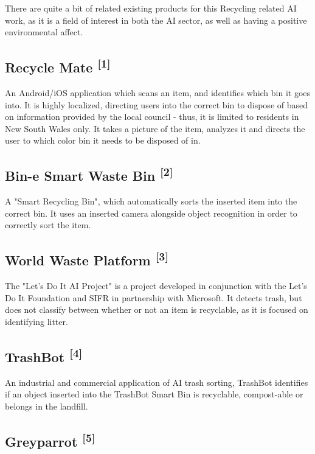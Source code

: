 \documentclass[conference]{IEEEtran}
\begin{document}
There are quite a bit of related existing products for this Recycling related AI work, as it is a field of interest in both the AI sector, as well as having a positive environmental affect.

\subsection{Recycle Mate \textsuperscript{[1]}}

An Android/iOS application which scans an item, and identifies which bin it goes into. It is highly localized, directing users into the correct bin to dispose of based on information provided by the local council - thus, it is limited to residents in New South Wales only. It takes a picture of the item, analyzes it and directs the user to which color bin it needs to be disposed of in.

\subsection{Bin-e Smart Waste Bin \textsuperscript{[2]}}

A "Smart Recycling Bin", which automatically sorts the inserted item into the correct bin. It uses an inserted camera alongside object recognition in order to correctly sort the item.

\subsection{World Waste Platform \textsuperscript{[3]}}

The "Let's Do It AI Project" is a project developed in conjunction with the Let's Do It Foundation and SIFR in partnership with Microsoft. It detects trash, but does not classify between whether or not an item is recyclable, as it is focused on identifying litter.

\subsection{TrashBot \textsuperscript{[4]}}

An industrial and commercial application of AI trash sorting, TrashBot identifies if an object inserted into the TrashBot Smart Bin is recyclable, compost-able or belongs in the landfill. 

\subsection{Greyparrot \textsuperscript{[5]}}
\end{document}
